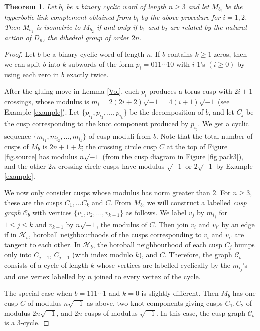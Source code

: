 \documentclass[reqno]{amsproc}  %
\newtheorem{thm}[prop]{\bf Theorem}
\begin{document}
\begin{thm}\label{change_mfd}
Let $b_i$ be a binary cyclic word of length $n\ge 3$ 
and let $M_{b_i}$ be the hyperbolic link complement
obtained from $b_i$ by the above procedure for $i = 1,2$.
Then $M_{b_1}$ is isometric to $M_{b_2}$ if and only if $b_1$ and $b_2$ are related by the natural action of $D_n$, the dihedral group of order $2n$.
\end{thm}
\begin{proof}
Let $b$ be a binary cyclic word of length $n$. If $b$ contains $k \ge 1$ zeros,
then we can split $b$ into $k$ subwords of the  form $p_i =  011 \cdots  10$
with $i$ $1$'s $(i\geq 0)$ by using each zero
in $b$ exactly twice.

After the gluing move in Lemma \ref{Vol}, each $p_{i}$ produces a torus cusp with $2i+1$ crossings, whose modulus is $m_i = 2(2i+2)\sqrt{-1} = 4(i+1)\sqrt{-1}$ (see Example \ref{example}).
Let $\{ p_{i_1}, p_{i_2},..., p_{i_k} \}$ be the decomposition of $b$, and let 
$C_j$ be the cusp corresponding to the knot component produced by $p_{i_j}$. 
We get a cyclic sequence $\{m_{i_1}, m_{i_2}, ..., m_{i_k}\}$ of cusp moduli from $b$.
Note that the total number of cusps of $M_b$ is $2n+1+k$;  the crossing circle cusp 
$C$ at the top of
Figure \ref{fig.source} has modulus $n \sqrt{-1}$ (from the cusp diagram in Figure \ref{fig.pack3}), 
and the other $2n$ crossing circle cusps
have modulus $\sqrt{-1}$ or $2\sqrt{-1}$ by Example \ref{example}.

We now only consider cusps whose modulus has norm greater than $2$.
For $n \ge 3$,
these are the cusps $C_1, \ldots C_k$ and $C$.
From $M_b$, we will construct a labelled {\em cusp graph}  $\mathcal{C}_b$ 
with vertices $\{v_1, v_2, ..., v_{k+1}\}$ as follows.
We label $v_j$ by $m_{i_j}$ for $1\leq j\leq k$ and $v_{k+1}$ by $n\sqrt{-1}$, 
the modulus of $C$. 
Then join $v_i$ and $v_{i'}$ by an edge if in $\mathcal{H}_b$, horoball neighbourhoods of the cusps corresponding to $v_i$ and $v_{i'}$ are tangent to each other.
In $\mathcal{H}_b$, the horoball neighbourhood of each cusp $C_j$ bumps only into $C_{j-1}$, $C_{j+1}$ (with index modulo $k$), and $C$.
Therefore, the graph $\mathcal{C}_b$  
consists of a cycle of length $k$ whose vertices are labelled cyclically by the $m_{i_j}$'s and one vertex labelled by $n$ joined to every vertex of the cycle. 

The special case when $b=111 \cdots 1$ and $k=0$ is slightly different. Then $M_b$ has one cusp $C$ of modulus
$n \sqrt{-1}$ as above, two knot components giving cusps $C_1,C_2$ of modulus $2n \sqrt{-1}$, and $2n$
cusps of modulus $\sqrt{-1}$. In this case, the cusp graph $\mathcal{C}_b$ is a 3-cycle.


\end{proof}
\end{document}
